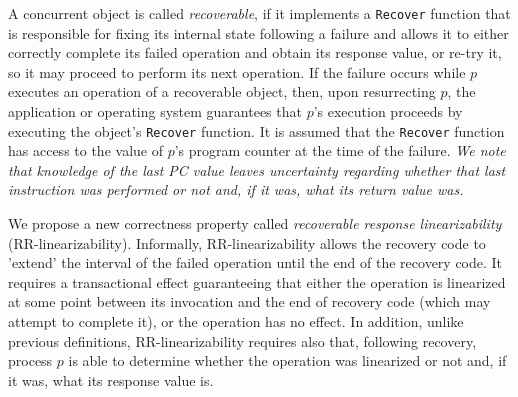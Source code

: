 A concurrent object is called \emph{recoverable}, if it implements a \texttt{Recover} function that is responsible for fixing its internal state following a failure and allows it to either correctly complete its failed operation and obtain its response value, or re-try it, so it may proceed to perform its next operation. If the failure occurs while $p$ executes an operation of a recoverable object, then, upon resurrecting $p$, the application or operating system guarantees that $p$'s execution proceeds by executing the object's \texttt{Recover} function. It is assumed that the \texttt{Recover} function has access to the value of $p$'s program counter at the time of the failure. \emph{We note that knowledge of the last PC value leaves uncertainty regarding whether that last instruction was performed or not and, if it was, what its return value was.}

We propose a new correctness property called \emph{recoverable response linearizability} (RR-linearizability). Informally, RR-linearizability allows the recovery code to 'extend' the interval of the failed operation until the end of the recovery code. It requires a transactional effect guaranteeing that either the operation is linearized at some point between its invocation and the end of recovery code (which may attempt to complete it), or the operation has no effect. In addition, unlike previous definitions, RR-linearizability requires also that, following recovery, process $p$ is able to determine whether the operation was linearized or not and, if it was, what its response value is.


